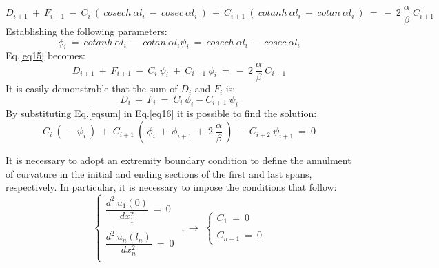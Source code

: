 \documentclass{article}
\begin{document}
{\begin{equation}
    D_{i+1} \ + \ F_{i+1} \ - \ C_i \ ( \ cosech\ \alpha l_i\ -  \ cosec\ \alpha l_i\ ) \ + \ C_{i+1} \ ( \ cotanh\ \alpha l_i\ - \ cotan\ \alpha l_i \ ) \ = \ - \ 2 \  \dfrac{\alpha}{\beta} \ C_{i+1}
     \label{eq15}
\end{equation}
Establishing the following parameters:
\begin{subequations}
\begin{equation}
 \phi_i \ = \  cotanh \ \alpha l_i\  - \ cotan\ \alpha l_i
\end{equation}
\begin{equation}
 \psi_i \ = \ cosech\ \alpha l_i\  - \ cosec\ \alpha l_i
\end{equation}
\end{subequations}
Eq.\ref{eq15} becomes:
\begin{equation}
    D_{i+1} \ + \ F_{i+1} \ - \ C_i \ \psi_i \ + \ C_{i+1} \ \phi_i \ = \ - \ 2 \  \dfrac{\alpha}{\beta} \ C_{i+1}
    \label{eq16}
\end{equation}
It is easily demonstrable that the sum of $D_i$ and $F_i$ is:
\begin{equation}
D_i \ + \ F_i \ = \ C_i \ \phi_i - C_{i+1} \ \psi_i 
\label{eqsum}
\end{equation}
By substituting Eq.\ref{eqsum} in Eq.\ref{eq16} it is possible to find the solution:
\begin{equation}
    C_i \ (\ - \psi_i \ ) \ + \ C_{i+1}\ ( \ \phi_i \ + \ \phi_{i+1} \ + \ 2 \  \dfrac{\alpha}{\beta} \ ) \  - \ C_{i+2} \ \psi_{i+1} \ = \ 0
    \label{eqsol}
\end{equation}

\noindent It is necessary to adopt an extremity boundary condition to define the annulment of curvature in the initial and ending sections of the first and last spans, respectively.
In particular, it is necessary to impose the conditions that follow:
\begin{equation}
    \begin{cases}
    \dfrac{d^2 \ u_1(0)}{dx_1^2} \ = \ 0\\
    \\
    
    \dfrac{d^2 \ u_n(l_n)}{dx_n^2} \ = \ 0\\
    \end{cases}
    \, \ ,\xrightarrow{} \, \, 
    \begin{cases}
     C_1 \ = \ 0\\
     \\
     C_{n+1} \ = \ 0 
    \end{cases}
\end{equation}

}
\end{document}
